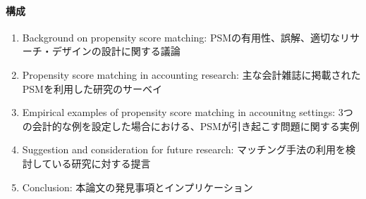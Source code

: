 \paragraph{構成}
\begin{enumerate}
 \item Background on propensity score matching: PSMの有用性、誤解、適切なリサーチ・デザインの設計に関する議論
 \item Propensity score matching in accounting research: 主な会計雑誌に掲載されたPSMを利用した研究のサーベイ
 \item Empirical examples of propensity score matching in accounitng settings: 3つの会計的な例を設定した場合における、PSMが引き起こす問題に関する実例
 \item Suggestion and consideration for future research: マッチング手法の利用を検討している研究に対する提言 
 \item Conclusion: 本論文の発見事項とインプリケーション 
\end{enumerate}




